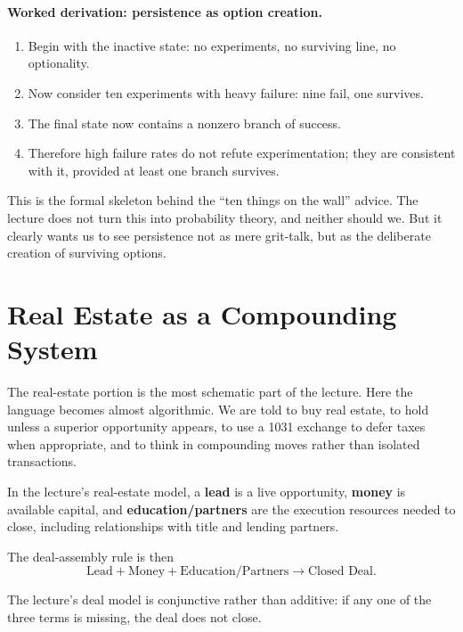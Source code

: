 \paragraph{Worked derivation: persistence as option creation.}
\begin{enumerate}
\item Begin with the inactive state: no experiments, no surviving line, no optionality.
\item Now consider ten experiments with heavy failure: nine fail, one survives.
\item The final state now contains a nonzero branch of success.
\item Therefore high failure rates do not refute experimentation; they are consistent with it, provided at least one branch survives.
\end{enumerate}

This is the formal skeleton behind the ``ten things on the wall'' advice. The lecture does not turn this into probability theory, and neither should we. But it clearly wants us to see persistence not as mere grit-talk, but as the deliberate creation of surviving options.

\section{Real Estate as a Compounding System}

The real-estate portion is the most schematic part of the lecture. Here the language becomes almost algorithmic. We are told to buy real estate, to hold unless a superior opportunity appears, to use a 1031 exchange to defer taxes when appropriate, and to think in compounding moves rather than isolated transactions.

\begin{definition}
In the lecture's real-estate model, a \textbf{lead} is a live opportunity, \textbf{money} is available capital, and \textbf{education/partners} are the execution resources needed to close, including relationships with title and lending partners.
\end{definition}

The deal-assembly rule is then
\begin{equation}
\text{Lead}+\text{Money}+\text{Education/Partners} \to \text{Closed Deal}.
\end{equation}

\begin{proposition}
The lecture's deal model is conjunctive rather than additive: if any one of the three terms is missing, the deal does not close.
\end{proposition}

